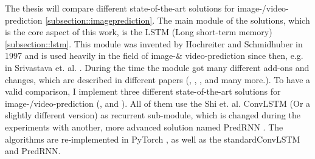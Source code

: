 The thesis will compare different state-of-the-art solutions for image-/video-prediction \ref{subsection::imageprediction}.
The main module of the solutions, which is the core aspect of this work, is the LSTM (Long short-term memory) \ref{subsection::lstm}.
This module was invented by Hochreiter and Schmidhuber  \cite{Hochreiter1997} in 1997 and is used heavily in the field of image-\& video-prediction since then, e.g. in Srivastava et. al. 
\cite{Srivastava2015}.
During the time the module got many different add-ons and changes, which are described in different papers (\cite{Patraucean2015}, \cite{Lotter2016}, \cite{Wang2017}, \cite{Wang2018} and many 
more.). To have a valid comparison, I implement three different state-of-the-art solutions for image-/video-prediction (\cite{Shi2015}, \cite{Patraucean2015} and \cite{Lotter2016}).
All of them use the Shi et. al. ConvLSTM \cite{Shi2015} (Or a slightly different version) as recurrent sub-module, which is changed during the experiments
with another, more advanced solution named PredRNN \cite{Wang2017}. The algorithms are re-implemented in PyTorch \cite{Paszke2019}, as well as the \glqq standard\grqq ConvLSTM and PredRNN.